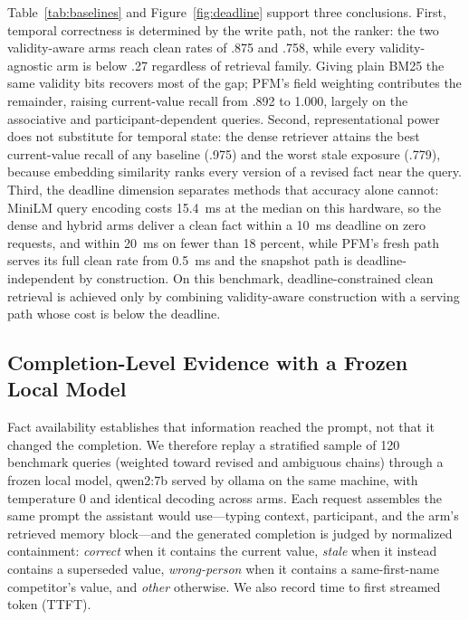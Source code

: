 \documentclass[letterpaper]{article} %
\begin{document}
Table~\ref{tab:baselines} and Figure~\ref{fig:deadline} support three conclusions. First, temporal correctness is determined by the write path, not the ranker: the two validity-aware arms reach clean rates of .875 and .758, while every validity-agnostic arm is below .27 regardless of retrieval family. Giving plain BM25 the same validity bits recovers most of the gap; PFM's field weighting contributes the remainder, raising current-value recall from .892 to 1.000, largely on the associative and participant-dependent queries. Second, representational power does not substitute for temporal state: the dense retriever attains the best current-value recall of any baseline (.975) and the worst stale exposure (.779), because embedding similarity ranks every version of a revised fact near the query. Third, the deadline dimension separates methods that accuracy alone cannot: MiniLM query encoding costs 15.4~ms at the median on this hardware, so the dense and hybrid arms deliver a clean fact within a 10~ms deadline on zero requests, and within 20~ms on fewer than 18 percent, while PFM's fresh path serves its full clean rate from 0.5~ms and the snapshot path is deadline-independent by construction. On this benchmark, deadline-constrained clean retrieval is achieved only by combining validity-aware construction with a serving path whose cost is below the deadline.

\subsection{Completion-Level Evidence with a Frozen Local Model}

Fact availability establishes that information reached the prompt, not that it changed the completion. We therefore replay a stratified sample of 120 benchmark queries (weighted toward revised and ambiguous chains) through a frozen local model, qwen2:7b served by ollama on the same machine, with temperature 0 and identical decoding across arms. Each request assembles the same prompt the assistant would use---typing context, participant, and the arm's retrieved memory block---and the generated completion is judged by normalized containment: \emph{correct} when it contains the current value, \emph{stale} when it instead contains a superseded value, \emph{wrong-person} when it contains a same-first-name competitor's value, and \emph{other} otherwise. We also record time to first streamed token (TTFT).
\end{document}
